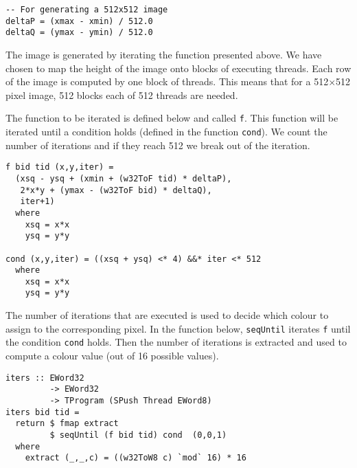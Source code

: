 \begin{small}
\begin{verbatim} 
-- For generating a 512x512 image
deltaP = (xmax - xmin) / 512.0
deltaQ = (ymax - ymin) / 512.0
\end{verbatim}
\end{small} 

The image is generated by iterating the function presented above.
We have chosen to map the 
height of the image onto blocks of executing threads. Each row of the
image is computed by one block of threads. This means that for a 512$\times$512 
pixel image, 512 blocks each of 512 threads are needed. 

The function to be iterated is defined below and called {\tt f}. This 
function will be iterated until a condition holds (defined in the function 
{\tt cond}). We count the number of iterations and if they reach 512 we 
break out of the iteration. 

\begin{small} 
\begin{verbatim} 
f bid tid (x,y,iter) = 
  (xsq - ysq + (xmin + (w32ToF tid) * deltaP),
   2*x*y + (ymax - (w32ToF bid) * deltaQ),
   iter+1) 
  where
    xsq = x*x
    ysq = y*y

cond (x,y,iter) = ((xsq + ysq) <* 4) &&* iter <* 512  
  where
    xsq = x*x
    ysq = y*y 

\end{verbatim} 
\end{small} 

The number of iterations that are executed is used to decide
which colour to assign to the corresponding pixel. In the function below,
{\tt seqUntil} iterates {\tt f} until the condition {\tt cond} 
holds. Then the number of iterations is extracted and used to compute 
a colour value (out of 16 possible values). 


\begin{small} 
\begin{verbatim} 
iters :: EWord32 
         -> EWord32 
         -> TProgram (SPush Thread EWord8)
iters bid tid =
  return $ fmap extract 
         $ seqUntil (f bid tid) cond  (0,0,1)
  where
    extract (_,_,c) = ((w32ToW8 c) `mod` 16) * 16
\end{verbatim}
\end{small}

